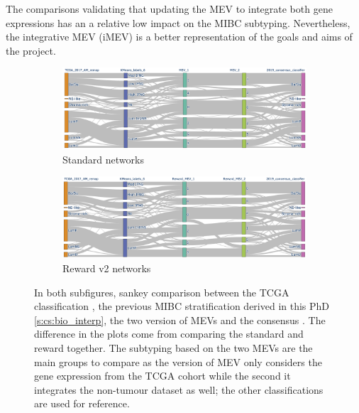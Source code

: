 The comparisons validating that updating the MEV to integrate both gene expressions has an a relative low impact on the MIBC subtyping. Nevertheless, the integrative MEV (iMEV) is a better representation of the goals and aims of the project.


\begin{figure}[!htb]
    \centering
    \begin{subfigure}{1.0\linewidth}
        \includegraphics[width=1.0\textwidth,keepaspectratio]{Sections/Network_II/validation/mevs_comp_std.png}
        \caption{Standard networks}
    \end{subfigure} %
    \centering
    \begin{subfigure}{1.0\linewidth}
        \includegraphics[width=1.0\textwidth,keepaspectratio]{Sections/Network_II/validation/mevs_comp_rwd.png}
        \caption{Reward v2 networks}
    \end{subfigure}
    \centering
    \caption{In both subfigures, sankey comparison between the TCGA classification \citet{Robertson2017-mg}, the previous MIBC stratification derived in this PhD \cref{s:cs:bio_interp}, the two version of MEVs and the consensus \citet{Kamoun2020-tj}. The difference in the plots come from comparing the standard and reward together. The subtyping based on the two MEVs are the main groups to compare as the version of MEV only considers the gene expression from the TCGA cohort while the second it integrates the non-tumour dataset as well; the other classifications are used for reference.}
    \label{fig:N_II:mevs_comp}
\end{figure}

